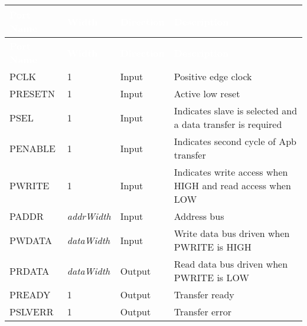 \begingroup
\small
{} %
\begin{longtable}[H]{
  | p{}
  | p{}
  | p{}
  | p{} |
  }

  \hline
  \rowcolor{gray}
  \textcolor{white}{\textbf{Port Name}} & 
  \textcolor{white}{\textbf{Width}} & 
  \textcolor{white}{\textbf{Direction}} & 
  \textcolor{white}{\textbf{Description}} \\ \hline
  \endfirsthead

  \hline
  \rowcolor{gray}
  \textcolor{white}{\textbf{Port Name}} & 
  \textcolor{white}{\textbf{Width}} & 
  \textcolor{white}{\textbf{Direction}} & 
  \textcolor{white}{\textbf{Description}}\\ \hline
  \endhead

  \hline
  \endfoot


  PCLK &       
  1 &       
  Input &       
  Positive edge clock \\ \hline

  PRESETN &       
  1 &       
  Input &       
  Active low reset \\ \hline

  PSEL &       
  1 & 
  Input &       
  Indicates slave is selected and a data transfer is required \\ \hline

  PENABLE &        
  1 & 
  Input &       
  Indicates second cycle of Apb transfer \\ \hline

  PWRITE &        
  1 & 
  Input &       
  Indicates write access when HIGH and read access when LOW\\ \hline

  PADDR &      
  \textit{addrWidth} & 
  Input &     
  Address bus \\ \hline

  PWDATA &      
  \textit{dataWidth} & 
  Input &     
  Write data bus driven when PWRITE is HIGH\\ \hline

  PRDATA &      
  \textit{dataWidth} & 
  Output &     
  Read data bus driven when PWRITE is LOW\\ \hline
 
  PREADY &        
  1 & 
  Output &       
  Transfer ready \\ \hline

  PSLVERR &        
  1 & 
  Output &       
  Transfer error \\ \hline
  
\end{longtable}
\captionsetup{aboveskip=0pt}
\label{table:interface}
\endgroup
